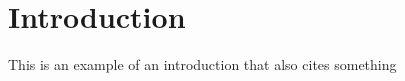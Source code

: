 \section{Introduction}

This is an example of an introduction that also cites something \cite{bartlett2017Mapping}
